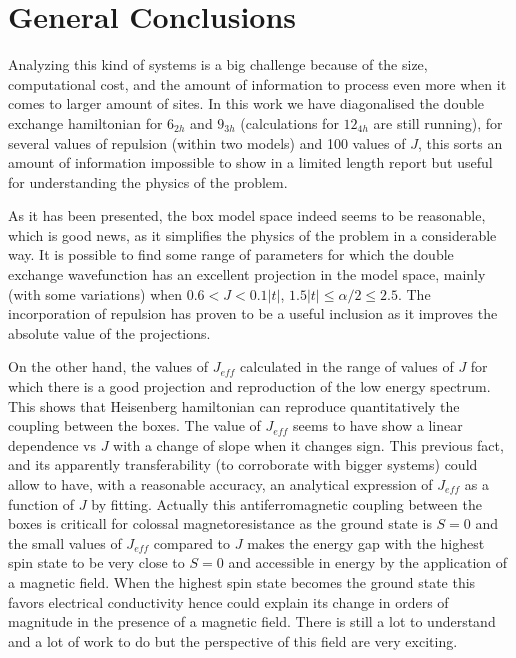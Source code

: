 \documentclass[12pt,twoside]{report}
\begin{document}
	\chapter*{ General Conclusions}

	Analyzing this kind of systems is a big challenge because of the size,
	computational cost, and the amount of information to process even more when
	it comes to larger amount of sites. In this work we have diagonalised the
	double exchange hamiltonian for $6_{2h}$ and $9_{3h}$ (calculations for
	$12_{4h}$ are still running), for several values of repulsion (within two
	models) and 100 values of $J$, this sorts an amount of information
	impossible to show in a limited length report but useful for
	understanding the physics of the problem.
	
	As it has been presented, the box model space indeed seems to be reasonable,
	which is good news, as it simplifies the physics of the problem in a
	considerable way. It is possible to find some range of parameters for which
	the double exchange wavefunction has an excellent projection in the model
	space, mainly (with some variations) when $0.6 < J < 0.1|t|$, $1.5|t| \leq
	\alpha \slash 2 \leq 2.5$. The incorporation of repulsion has proven to
	be a useful inclusion as it improves the absolute value of the projections.
	
	On the other hand, the values of $J_{eff}$ calculated in the range of values
	of $J$ for which there is a good projection and reproduction of the low
	energy spectrum. This shows that Heisenberg hamiltonian can reproduce
	quantitatively the coupling between the boxes.  The value of $J_{eff}$ seems
	to have show a linear dependence vs $J$ with a change of slope when it
	changes sign. This previous fact, and its apparently transferability (to
	corroborate with bigger systems) could allow to have, with a reasonable
	accuracy, an analytical expression of $J_{eff}$ as a function of $J$ by
	fitting. Actually this antiferromagnetic coupling between the boxes is
	criticall for colossal magnetoresistance as the ground state is $S=0$ and
	the small values of $J_{eff}$ compared to $J$ makes the energy gap with the
	highest spin state to be very close to $S=0$ and accessible in energy by the
	application of a magnetic field. When the highest spin state becomes the
	ground state this favors electrical conductivity hence could explain its
	change in orders of magnitude in the presence of a magnetic field.
	There is still a lot to understand and a lot of work to do but the
	perspective of this field are very exciting.


	\newpage
	\renewcommand{\bibname}{References}
		\setcounter{page}{2}
\end{document}
